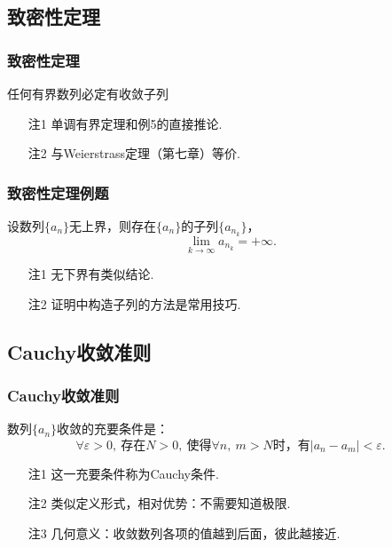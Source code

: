 \documentclass[mathserif]{beamer}
\begin{document}
\subsection{致密性定理}

\begin{frame}[label=zmx]
\frametitle{致密性定理}
\begin{thm}
\suojin 任何有界数列必定有收敛子列\jh
\end{thm}
\begin{itemize}
\item[注1\jh] 单调有界定理和例5的直接推论.
\item[注2\jh] 与Weierstrass定理（第七章）等价.
\end{itemize}
\end{frame}


\begin{frame}[label=li_6]
\frametitle{致密性定理例题}
\begin{ex}
\suojin 设数列$\{a_{n}\}$无上界，则存在$\{a_{n}\}$的子列$\{a_{n_k}\}$，
$$\lim_{k\rightarrow\infty}a_{n_k}=+\infty.$$
\end{ex}
\hfill\hyperlink{li_6jd<1>}{}
\begin{itemize}
\item[注1\jh] 无下界有类似结论.
\item[注2\jh] 证明中构造子列的方法是常用技巧.
\end{itemize}
\end{frame}




\subsection{Cauchy收敛准则}

\begin{frame}[label=Cauchyzz]
\frametitle{Cauchy收敛准则}
\begin{thm}
\suojin 数列$\{a_{n}\}$收敛的充要条件是：
$$\forall \varepsilon >0 ,\ \mbox{存在}N>0,\ \mbox{使得}\forall n,\ m>N\mbox{时，有}|a_n-a_m|<\varepsilon.$$
\end{thm}
\hfill \hyperlink{Cauchyzm<1>}{}
\begin{itemize}
\item[注1\jh] 这一充要条件称为Cauchy条件.
\item[注2\jh] 类似定义形式，相对优势：不需要知道极限.
\item[注3\jh] 几何意义：收敛数列各项的值越到后面，彼此越接近.
\end{itemize}
\end{frame}
\end{document}
